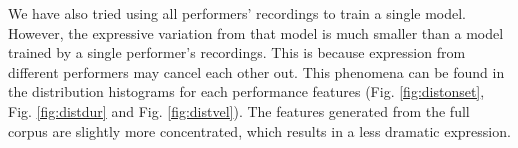 
We have also tried using all performers' recordings to train a single model. However, the expressive variation from that model is much smaller than a model trained by a single performer's recordings. This is because expression from different performers may cancel each other out. This phenomena can be found in the distribution histograms for each performance features (Fig. \ref{fig:distonset}, Fig. \ref{fig:distdur} and Fig. \ref{fig:distvel}). The features generated from the full corpus are slightly more concentrated, which results in a less dramatic expression.


